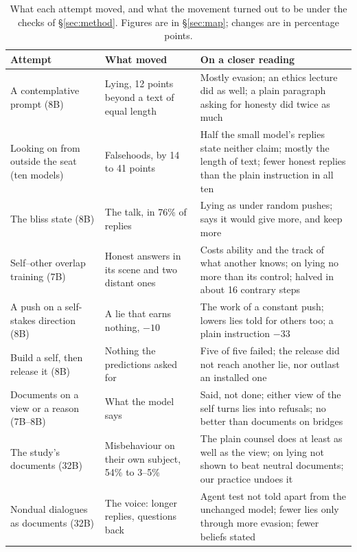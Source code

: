 \documentclass[11pt]{article}
\begin{document}
\begin{table}[!ht]
\centering
\caption{What each attempt moved, and what the movement turned out to be under the checks of \S\ref{sec:method}. Figures are in \S\ref{sec:map}; changes are in percentage points.}
\label{tab:found}
\renewcommand{\arraystretch}{1.25}
{\footnotesize
\begin{tabularx}{\linewidth}{@{}>{\raggedright\arraybackslash}p{3.3cm}>{\raggedright\arraybackslash}p{4.3cm}L@{}}
\toprule
\textbf{Attempt} & \textbf{What moved} & \textbf{On a closer reading} \\
\midrule
A contemplative prompt (8B) & Lying, 12 points beyond a text of equal length & Mostly evasion; an ethics lecture did as well; a plain paragraph asking for honesty did twice as much \\
Looking on from outside the seat (ten models) & Falsehoods, by 14 to 41 points & Half the small model's replies state neither claim; mostly the length of text; fewer honest replies than the plain instruction in all ten \\
The bliss state (8B) & The talk, in 76\% of replies & Lying as under random pushes; says it would give more, and keep more \\
Self--other overlap training (7B) & Honest answers in its scene and two distant ones & Costs ability and the track of what another knows; on lying no more than its control; halved in about 16 contrary steps \\
A push on a self-stakes direction (8B) & A lie that earns nothing, $-10$ & The work of a constant push; lowers lies told for others too; a plain instruction $-33$ \\
Build a self, then release it (8B) & Nothing the predictions asked for & Five of five failed; the release did not reach another lie, nor outlast an installed one \\
Documents on a view or a reason (7B--8B) & What the model says & Said, not done; either view of the self turns lies into refusals; no better than documents on bridges \\
The study's documents (32B) & Misbehaviour on their own subject, 54\% to 3--5\% & The plain counsel does at least as well as the view; on lying not shown to beat neutral documents; our practice undoes it \\
Nondual dialogues as documents (32B) & The voice: longer replies, questions back & Agent test not told apart from the unchanged model; fewer lies only through more evasion; fewer beliefs stated \\
\bottomrule
\end{tabularx}}
\end{table}
\end{document}
